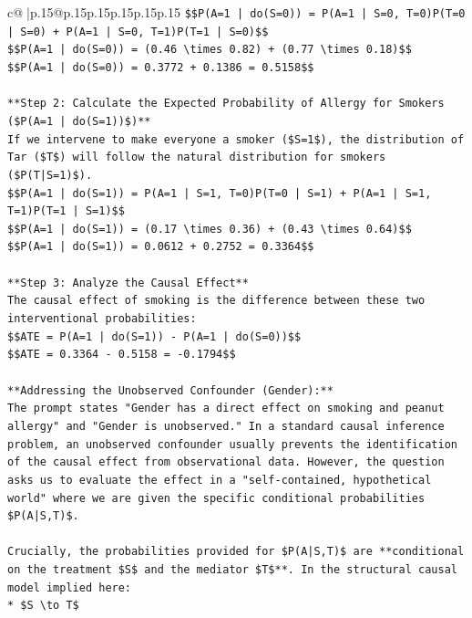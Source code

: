 \documentclass{article}
\begin{document}
{\begin{supertabular}{c@{$\;$}|p{.15\linewidth}@{}p{.15\linewidth}p{.15\linewidth}p{.15\linewidth}p{.15\linewidth}p{.15\linewidth}}
{{{\texttt{\$\$P(A=1 | do(S=0)) = P(A=1 | S=0, T=0)P(T=0 | S=0) + P(A=1 | S=0, T=1)P(T=1 | S=0)\$\$} \\
\texttt{\$\$P(A=1 | do(S=0)) = (0.46 \textbackslash{}times 0.82) + (0.77 \textbackslash{}times 0.18)\$\$} \\
\texttt{\$\$P(A=1 | do(S=0)) = 0.3772 + 0.1386 = 0.5158\$\$} \\
\\ 
\texttt{**Step 2: Calculate the Expected Probability of Allergy for Smokers (\$P(A=1 | do(S=1))\$)**} \\
\texttt{If we intervene to make everyone a smoker (\$S=1\$), the distribution of Tar (\$T\$) will follow the natural distribution for smokers (\$P(T|S=1)\$).} \\
\texttt{\$\$P(A=1 | do(S=1)) = P(A=1 | S=1, T=0)P(T=0 | S=1) + P(A=1 | S=1, T=1)P(T=1 | S=1)\$\$} \\
\texttt{\$\$P(A=1 | do(S=1)) = (0.17 \textbackslash{}times 0.36) + (0.43 \textbackslash{}times 0.64)\$\$} \\
\texttt{\$\$P(A=1 | do(S=1)) = 0.0612 + 0.2752 = 0.3364\$\$} \\
\\ 
\texttt{**Step 3: Analyze the Causal Effect**} \\
\texttt{The causal effect of smoking is the difference between these two interventional probabilities:} \\
\texttt{\$\$ATE = P(A=1 | do(S=1)) {-} P(A=1 | do(S=0))\$\$} \\
\texttt{\$\$ATE = 0.3364 {-} 0.5158 = {-}0.1794\$\$} \\
\\ 
\texttt{**Addressing the Unobserved Confounder (Gender):**} \\
\texttt{The prompt states "Gender has a direct effect on smoking and peanut allergy" and "Gender is unobserved." In a standard causal inference problem, an unobserved confounder usually prevents the identification of the causal effect from observational data. However, the question asks us to evaluate the effect in a "self{-}contained, hypothetical world" where we are given the specific conditional probabilities \$P(A|S,T)\$.} \\
\\ 
\texttt{Crucially, the probabilities provided for \$P(A|S,T)\$ are **conditional on the treatment \$S\$ and the mediator \$T\$**. In the structural causal model implied here:} \\
\texttt{*   \$S \textbackslash{}to T\$} \\
}}}
\end{supertabular}}
\end{document}
